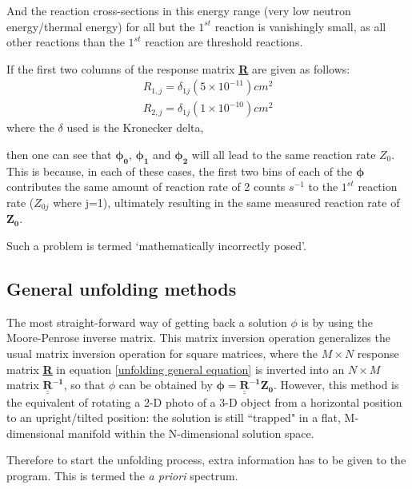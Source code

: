 \documentclass[a4paper, 12pt]{article}
\newcommand{\matr}[1]{\underline{\underline{\textbf{#1}}}}
\newcommand{\ve}[1]{\boldsymbol{#1}}
\begin{document}
And the reaction cross-sections in this energy range (very low neutron energy/thermal energy) for all but the $1^{st}$ reaction is vanishingly small, as all other reactions than the $1^{st}$ reaction are threshold reactions.

If the first two columns of the response matrix \matr{R} are given as follows:
\begin{align}
    R_{1,j} = \delta_{1j}(5 \times 10^{-11}) cm^2 \\
    R_{2,j} = \delta_{1j}(1 \times 10^{-10}) cm^2
\end{align}
where the $\delta$ used is the Kronecker delta,

then one can see that $\ve{\phi_{0}}$, $\ve{\phi_{1}}$ and $\ve{\phi_2}$ will all lead to the same reaction rate $Z_{0}$. This is because, in each of these cases, the first two bins of each of the $\ve{\phi}$ contributes the same amount of reaction rate of 2 counts $s^{-1}$ to the $1^{st}$ reaction rate ($Z_{0j}$ where j=1), ultimately resulting in the same measured reaction rate of $\ve{Z_{0}}$.

Such a problem is termed `mathematically incorrectly posed'. \cite{BirminghamUnfolding}


\subsection{General unfolding methods} \label{general methods}
The most straight-forward way of getting back a solution $\phi$ is by using the Moore-Penrose inverse matrix. This matrix inversion operation generalizes the usual matrix inversion operation for square matrices, where the $M\times N$ response matrix \matr{R} in equation \ref{unfolding general equation} is inverted into an $N \times M$ matrix $\mathbf{\underline{\underline{R}}^{-1}}$, so that $\phi$ can be obtained by $\ve{\phi} = \mathbf{\underline{\underline{R}}^{-1}} \ve{Z_0}$. However, this method is the equivalent of rotating a 2-D photo of a 3-D object from a horizontal position to an upright/tilted position: the solution is still ``trapped" in a flat, M-dimensional manifold within the N-dimensional solution space.

Therefore to start the unfolding process, extra information has to be given to the program. This is termed the \emph{a priori} spectrum.
\end{document}
